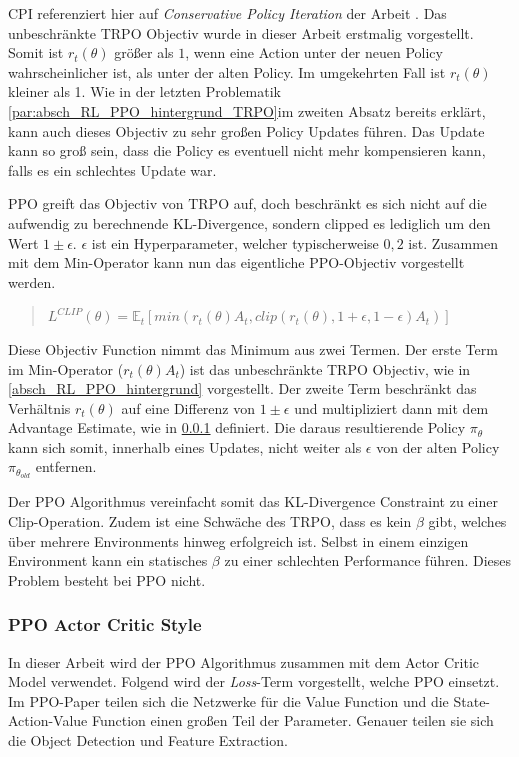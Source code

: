 CPI referenziert hier auf \emph{Conservative Policy Iteration} der Arbeit \cite{kakade2002approximately}. Das unbeschränkte TRPO Objectiv wurde in dieser Arbeit erstmalig vorgestellt. Somit ist $ r_t(\theta) $ größer als $ 1 $, wenn eine Action unter der neuen Policy wahrscheinlicher ist, als unter der alten Policy. Im umgekehrten Fall ist $ r_t( \theta ) $ kleiner als 1. Wie in der letzten Problematik \ref{par:absch_RL_PPO_hintergrund_TRPO}im zweiten Absatz bereits erklärt, kann auch dieses Objectiv zu sehr großen Policy Updates führen. Das Update kann so groß sein, dass die Policy es eventuell nicht mehr kompensieren kann, falls es ein schlechtes Update war. 

PPO greift das Objectiv von TRPO auf, doch beschränkt es sich nicht auf die aufwendig zu berechnende KL-Divergence, sondern clipped es lediglich um den Wert $ 1 \pm \epsilon $. $ \epsilon $ ist ein Hyperparameter, welcher typischerweise $0,2$ ist. Zusammen mit dem Min-Operator kann nun das eigentliche PPO-Objectiv vorgestellt werden. 

\begin{quotation}
\label{PPO-clip-objective}
\centering
   \( L^{CLIP}(\theta) =  \mathbb{E}_t [ min ( r_t(\theta) A_t , clip ( r_t(\theta), 1 + \epsilon, 1 - \epsilon ) A_t ) ] \)
\end{quotation}

Diese Objectiv Function nimmt das Minimum aus zwei Termen. Der erste Term im Min-Operator ($ r_t(\theta) A_t $) ist das unbeschränkte TRPO Objectiv, wie in \ref{absch_RL_PPO_hintergrund} vorgestellt. Der zweite Term beschränkt das Verhältnis $ r_t(\theta) $ auf eine Differenz von $1 \pm \epsilon $ und multipliziert dann mit dem Advantage Estimate, wie in \ref{absch_RL_actorCriticPPO} definiert. Die daraus resultierende Policy $\pi_{\theta}$ kann sich somit, innerhalb eines Updates, nicht weiter als $ \epsilon $ von der alten Policy $ \pi_{\theta_{old}} $ entfernen. 

Der PPO Algorithmus vereinfacht somit das KL-Divergence Constraint zu einer Clip-Operation. Zudem ist eine Schwäche des TRPO, dass es kein $ \beta $ gibt, welches über mehrere Environments hinweg erfolgreich ist. Selbst in einem einzigen Environment kann ein statisches $ \beta $ zu einer schlechten Performance führen. Dieses Problem besteht bei PPO nicht. 



\subsubsection{PPO Actor Critic Style}\label{absch_RL_actorCriticPPO}
In dieser Arbeit wird der PPO Algorithmus zusammen mit dem Actor Critic Model verwendet. Folgend wird der \emph{Loss}-Term vorgestellt, welche PPO einsetzt. Im PPO-Paper teilen sich die Netzwerke für die Value Function und die State-Action-Value Function einen großen Teil der Parameter. Genauer teilen sie sich die Object Detection und Feature Extraction. 

